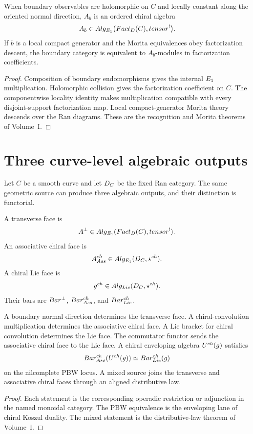 \begin{theorem}
When boundary observables are holomorphic on $C$ and locally constant along the oriented normal direction, $A_b$ is an ordered chiral algebra
\[
 A_b\in Alg_{E_1}\bigl(Fact_D(C),tensor^!\bigr).
\]
If $b$ is a local compact generator and the Morita equivalences obey factorization descent, the boundary category is equivalent to $A_b$-modules in factorization coefficients.
\end{theorem}
\begin{proof}
Composition of boundary endomorphisms gives the internal $E_1$ multiplication. Holomorphic collision gives the factorization coefficient on $C$. The componentwise locality identity makes multiplication compatible with every disjoint-support factorization map. Local compact-generator Morita theory descends over the Ran diagrams. These are the recognition and Morita theorems of Volume~I.
\end{proof}


\chapter{Three curve-level algebraic outputs}
Let $C$ be a smooth curve and let $D_C$ be the fixed Ran category.  The same geometric source can produce three algebraic outputs, and their distinction is functorial.

\begin{definition}
A transverse face is
\[
 A^\perp\in Alg_{E_1}(Fact_D(C),tensor^!).
\]
An associative chiral face is
\[
 A^{ch}_{Ass}\in Alg_{E_1}(D_C,\mathbin{\star^{ch}}).
\]
A chiral Lie face is
\[
 g^{ch}\in Alg_{Lie}(D_C,\mathbin{\star^{ch}}).
\]
Their bars are $Bar^{\perp}$, $Bar^{ch}_{Ass}$, and $Bar^{ch}_{Lie}$.
\end{definition}

\begin{theorem}
A boundary normal direction determines the transverse face.  A chiral-convolution multiplication determines the associative chiral face.  A Lie bracket for chiral convolution determines the Lie face.  The commutator functor sends the associative chiral face to the Lie face.  A chiral enveloping algebra $U^{ch}(g)$ satisfies
\[
 Bar^{ch}_{Ass}(U^{ch}(g))\simeq Bar^{ch}_{Lie}(g)
\]
on the nilcomplete PBW locus.  A mixed source joins the transverse and associative chiral faces through an aligned distributive law.
\end{theorem}
\begin{proof}
Each statement is the corresponding operadic restriction or adjunction in the named monoidal category.  The PBW equivalence is the enveloping lane of chiral Koszul duality.  The mixed statement is the distributive-law theorem of Volume~I.
\end{proof}

